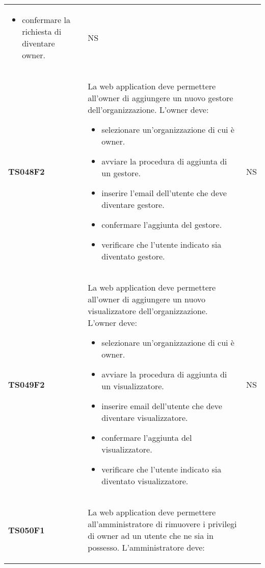\documentclass[../piano-di-qualifica.tex]{subfiles}
\begin{document}
\begin{centering}
\begin{longtable}[H]{>{\centering\bfseries}m{3cm} >{}p{10cm} >{\centering\arraybackslash}m{3cm}}
\begin{itemize}
                        \item confermare la richiesta di diventare owner.
                      \end{itemize}
                    & NS \\
        TS048F2     & La web application deve permettere all'owner di aggiungere un nuovo gestore dell'organizzazione. \newline
                      L'owner deve:
                      \begin{itemize}
                        \item selezionare un'organizzazione di cui è owner.
                        \item avviare la procedura di aggiunta di un gestore.
                        \item inserire l'email dell'utente che deve diventare gestore.
                        \item confermare l'aggiunta del gestore.
                        \item verificare che l'utente indicato sia diventato gestore.
                      \end{itemize}
                    & NS \\
        TS049F2     & La web application deve permettere all'owner di aggiungere un nuovo visualizzatore dell'organizzazione. \newline
                      L'owner deve:
                      \begin{itemize}
                        \item selezionare un'organizzazione di cui è owner.
                        \item avviare la procedura di aggiunta di un visualizzatore.
                        \item inserire email dell'utente che deve diventare visualizzatore.
                        \item confermare l'aggiunta del visualizzatore.
                        \item verificare che l'utente indicato sia diventato visualizzatore.
                      \end{itemize}
                    & NS \\
        TS050F1     & La web application deve permettere all'amministratore di rimuovere i privilegi di owner ad un utente che ne sia in possesso. \newline
                      L'amministratore deve:
                      \begin{itemize}

\end{itemize}
\end{longtable}
\end{centering}
\end{document}
